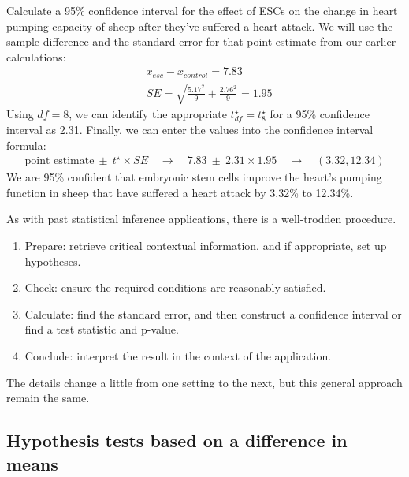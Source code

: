 \begin{examplewrap}
\begin{nexample}{Calculate a 95\% confidence interval for the effect of ESCs on the change in heart pumping capacity of sheep after they've suffered a heart attack.}
We will use the sample difference and the standard error for that point estimate from our earlier calculations:
\begin{align*}
& \bar{x}_{esc} - \bar{x}_{control} = 7.83 \\
& SE = \sqrt{\frac{5.17^2}{9} + \frac{2.76^2}{9}} = 1.95
\end{align*}
Using $df = 8$, we can identify the appropriate $t^{\star}_{df} = t^{\star}_{8}$ for a 95\% confidence interval as 2.31. Finally, we can enter the values into the confidence interval formula:
\begin{align*}
\text{point estimate} \ \pm\ t^{\star} \times SE
  \quad\rightarrow\quad 7.83 \ \pm\ 2.31\times 1.95
  \quad\rightarrow\quad (3.32, 12.34)
\end{align*}
We are 95\% confident that embryonic stem cells improve the heart's pumping function in sheep that have suffered a heart attack by 3.32\% to 12.34\%.
\end{nexample}
\end{examplewrap}


\noindent%
As with past statistical inference applications,
there is a well-trodden procedure.
\begin{enumerate}
\item Prepare: retrieve critical contextual information,
    and if appropriate, set up hypotheses.
\item Check: ensure the required conditions are reasonably
    satisfied.
\item Calculate: find the standard error, and then construct
    a confidence interval or find a test statistic and p-value.
\item Conclude: interpret the result in the context of the
    application.
\end{enumerate}
The details change a little from one setting to the next,
but this general approach remain the same.


\subsection{Hypothesis tests based on a difference in means}

